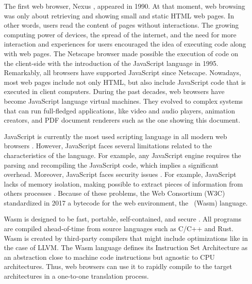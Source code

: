 {
	\color{red}
The first web browser, Nexus \cite{nexus}, appeared in 1990.
At that moment, web browsing was only about retrieving and showing small and static HTML web pages.
In other words, users read the content of pages without interactions.
The growing computing power of devices, the spread of the internet, and the need for more interaction and experiences for users encouraged the idea of executing code along with web pages.
The Netscape browser made possible the execution of code on the client-side with the introduction of the JavaScript \cite{10.1007/978-3-642-14107-2_7} language in 1995.
Remarkably, all browsers have supported JavaScript since Netscape. 
Nowadays, most web pages include not only HTML, but also include JavaScript code that is executed in client computers.
During the past decades, web browsers have become JavaScript language virtual machines. 
They evolved to complex systems that can run full-fledged applications, like video and audio players, animation creators, and PDF document renderers such as the one showing this document.



JavaScript is currently the most used scripting language in all modern web browsers \cite{mulazzani2013fast}. 
However, JavaScript faces several limitations related to the characteristics of the language. For example, any JavaScript engine requires the parsing and recompiling the JavaScript code, which implies a significant overhead.
Moreover, JavaScript faces security issues \cite{10.1145/1190216.1190252}.
For example, JavaScript lacks of memory isolation, making possible to extract pieces of information from others processes \cite{10.1145/3412841.3442001}.
Because of these problems, the Web Consortium (W3C) standardized in 2017 a bytecode for the web environment, the \wasm\ (Wasm) language. 

Wasm is designed to be fast, portable, self-contained, and secure \cite{Haas_2017}.
All \Wasm programs are compiled ahead-of-time from source languages such as C/C++ and Rust.
Wasm is created by third-party compilers that might include optimizations like in the case of LLVM.  
The Wasm language defines its Instruction Set Architecture \cite{wasm_spec} as an abstraction close to machine code instructions but agnostic to CPU architectures. Thus,  web browsers can use it to rapidly compile to the target architectures in a one-to-one translation process.

}
